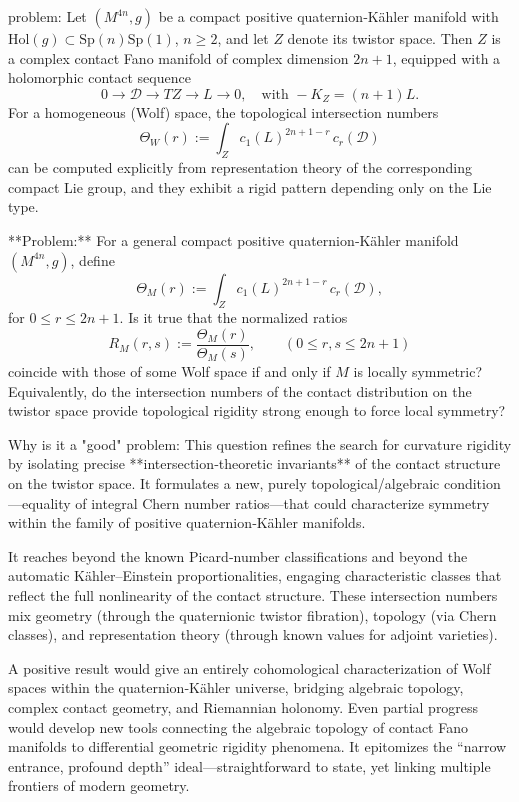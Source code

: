 problem:  
Let \((M^{4n},g)\) be a compact positive quaternion‑Kähler manifold with \(\mathrm{Hol}(g)\subset \mathrm{Sp}(n)\mathrm{Sp}(1)\), \(n\ge2\), and let \(Z\) denote its twistor space. Then \(Z\) is a complex contact Fano manifold of complex dimension \(2n+1\), equipped with a holomorphic contact sequence  
\[
0 \longrightarrow \mathcal D \longrightarrow TZ \longrightarrow L \longrightarrow 0,
\quad\text{with } -K_Z = (n+1)L.
\]  
For a homogeneous (Wolf) space, the topological intersection numbers  
\[
\Theta_W(r):=\int_Z c_1(L)^{2n+1-r}\,c_r(\mathcal D)
\]
can be computed explicitly from representation theory of the corresponding compact Lie group, and they exhibit a rigid pattern depending only on the Lie type.

**Problem:**  
For a general compact positive quaternion‑Kähler manifold \((M^{4n},g)\), define
\[
\Theta_M(r):=\int_Z c_1(L)^{2n+1-r}\,c_r(\mathcal D),
\]
for \(0\le r\le 2n+1\).  
Is it true that the normalized ratios
\[
R_M(r,s):=\frac{\Theta_M(r)}{\Theta_M(s)}, \qquad (0\le r,s\le 2n+1)
\]
coincide with those of some Wolf space if and only if \(M\) is locally symmetric?  
Equivalently, do the intersection numbers of the contact distribution on the twistor space provide topological rigidity strong enough to force local symmetry?

Why is it a "good" problem:  
This question refines the search for curvature rigidity by isolating precise **intersection‑theoretic invariants** of the contact structure on the twistor space. It formulates a new, purely topological/algebraic condition—equality of integral Chern number ratios—that could characterize symmetry within the family of positive quaternion‑Kähler manifolds.  

It reaches beyond the known Picard‑number classifications and beyond the automatic Kähler–Einstein proportionalities, engaging characteristic classes that reflect the full nonlinearity of the contact structure. These intersection numbers mix geometry (through the quaternionic twistor fibration), topology (via Chern classes), and representation theory (through known values for adjoint varieties).  

A positive result would give an entirely cohomological characterization of Wolf spaces within the quaternion‑Kähler universe, bridging algebraic topology, complex contact geometry, and Riemannian holonomy. Even partial progress would develop new tools connecting the algebraic topology of contact Fano manifolds to differential geometric rigidity phenomena. It epitomizes the “narrow entrance, profound depth” ideal—straightforward to state, yet linking multiple frontiers of modern geometry.